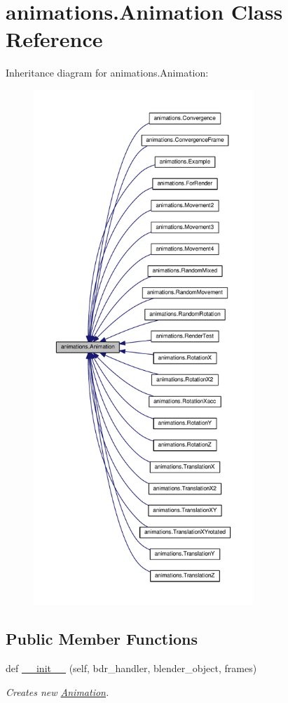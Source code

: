 \hypertarget{classanimations_1_1Animation}{}\section{animations.\+Animation Class Reference}
\label{classanimations_1_1Animation}


Inheritance diagram for animations.\+Animation\+:\nopagebreak
\begin{figure}[H]
\begin{center}
\leavevmode
\includegraphics[height=550pt]{classanimations_1_1Animation__inherit__graph}
\end{center}
\end{figure}
\subsection*{Public Member Functions}
\begin{DoxyCompactItemize}
\item 
def \hyperlink{classanimations_1_1Animation_aecd6f3fd72fbe0cd9cdab02f51cedc70}{\+\_\+\+\_\+init\+\_\+\+\_\+} (self, bdr\+\_\+handler, blender\+\_\+object, frames)
\begin{DoxyCompactList}\small\item\em Creates new \hyperlink{classanimations_1_1Animation}{Animation}. \end{DoxyCompactList}\end{DoxyCompactItemize}
